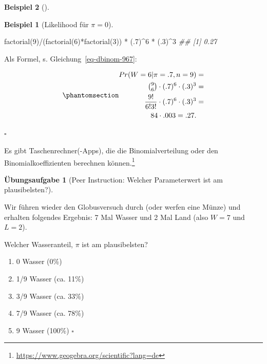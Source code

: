 \documentclass[
  ngerman,
  letterpaper,
  twoside,
  open=any]{scrbook}
\newenvironment{Shaded}{\begin{snugshade}}{\end{snugshade}}
\newcommand{\DecValTok}[1]{\textcolor[rgb]{0.68,0.00,0.00}{#1}}
\newcommand{\DocumentationTok}[1]{\textcolor[rgb]{0.37,0.37,0.37}{\textit{#1}}}
\newcommand{\FunctionTok}[1]{\textcolor[rgb]{0.28,0.35,0.67}{#1}}
\newcommand{\NormalTok}[1]{\textcolor[rgb]{0.00,0.23,0.31}{#1}}
\newcommand{\SpecialCharTok}[1]{\textcolor[rgb]{0.37,0.37,0.37}{#1}}
\providecommand{\tightlist}{%
  \setlength{\itemsep}{0pt}\setlength{\parskip}{0pt}}\usepackage{longtable,booktabs,array}
\theoremstyle{definition}
\newtheorem{example}{Beispiel}[chapter]
\theoremstyle{plain}
\theoremstyle{definition}
\newtheorem{exercise}{Übungsaufgabe}[chapter]
\theoremstyle{definition}
\theoremstyle{remark}
\begin{document}
\begin{example}[]
\begin{example}[Likelihood für
\(\pi=0\)]
\begin{Shaded}
\begin{Highlighting}[]
\FunctionTok{factorial}\NormalTok{(}\DecValTok{9}\NormalTok{)}\SpecialCharTok{/}\NormalTok{(}\FunctionTok{factorial}\NormalTok{(}\DecValTok{6}\NormalTok{)}\SpecialCharTok{*}\FunctionTok{factorial}\NormalTok{(}\DecValTok{3}\NormalTok{)) }\SpecialCharTok{*}\NormalTok{ (.}\DecValTok{7}\NormalTok{)}\SpecialCharTok{\^{}}\DecValTok{6} \SpecialCharTok{*}\NormalTok{ (.}\DecValTok{3}\NormalTok{)}\SpecialCharTok{\^{}}\DecValTok{3}
\DocumentationTok{\#\# [1] 0.27}
\end{Highlighting}
\end{Shaded}

Als Formel, s. Gleichung~\ref{eq-dbinom-967}:

\begin{equation}\protect\phantomsection\label{eq-dbinom-967}{\begin{aligned}
Pr(W=6 | \pi=.7, n=9) &=\\ 
\tbinom{9}{6} \cdot (.7)^6 \cdot (.3)^3 &=\\
\frac{9!}{6!3!} \cdot (.7)^6 \cdot (.3)^3 &=\\
84 \cdot  .003 = .27.
\end{aligned}}\end{equation}

\(\square\)

\end{example}

Es gibt Taschenrechner(-Apps), die die Binomialverteilung oder den
Binomialkoeffizienten berechnen können.\footnote{\url{https://www.geogebra.org/scientific?lang=de}}

\begin{exercise}[Peer Instruction: Welcher Parameterwert ist am
plausibelsten?]\protect\hypertarget{exr-globus}{}\label{exr-globus}

Wir führen wieder den Globusversuch durch (oder werfen eine Münze) und
erhalten folgendes Ergebnis: 7 Mal Wasser und 2 Mal Land (also \(W=7\)
und \(L=2\)).

Welcher Wasseranteil, \(\pi\) ist am plausibelsten?

\begin{enumerate}
\def\labelenumi{\Alph{enumi})}
\tightlist
\item
  0 Wasser (0\%)
\item
  1/9 Wasser (ca. 11\%)
\item
  3/9 Wasser (ca. 33\%)
\item
  7/9 Wasser (ca. 78\%)
\item
  9 Wasser (100\%) \(\square\)
\end{enumerate}


\end{exercise}
\end{example}
\end{document}
